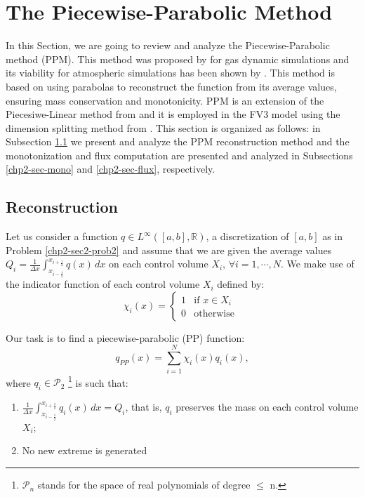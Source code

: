 \section{The Piecewise-Parabolic Method}
\label{chp2-sec-ppm}
In this Section, we are going to review and analyze the Piecewise-Parabolic method (PPM).
This method was proposed by \citet{colella:1984} for gas dynamic simulations and
its viability for atmospheric simulations has been shown by \citet{carpenter:1990}.
This method is based on using parabolas to reconstruct the function from its 
average values, ensuring mass conservation and monotonicity.
PPM is an extension of the Piecesiwe-Linear method from \citet{vanleer:1977}
and it is employed in the FV3 model using the dimension splitting method from \citet{lin:1996}.
This section is organized as follows: in Subsection \ref{chp2-sec-recon} 
we present and analyze the PPM reconstruction method and the monotonization and 
flux computation are presented and analyzed in Subsections 
\ref{chp2-sec-mono} and \ref{chp2-sec-flux}, respectively.


\subsection{Reconstruction}
\label{chp2-sec-recon}
Let us consider a function ${q} \in L^{\infty}([a, b],\mathbb{R})$, a discretization of
$[a,b]$ as in Problem \ref{chp2-sec2-prob2}
and assume that we are given the average values ${Q}_i = \frac{1}{\Delta x} 
\int_{x_{i-\frac{1}{2}}}^{x_{i+\frac{1}{2}}} {q}(x) \,dx$
on each control volume $X_i$, $\forall i = 1, \cdots, N $.
We make use of the indicator function of each control volume $X_i$ defined by:
\begin{equation*}
	\label{chp2-sec3-1-eq1}
	\chi_{i}(x)=
	\begin{cases}
		1 & \text{if } x \in X_i\\
		0 & \text{otherwise }
	\end{cases}
\end{equation*}

Our task is to find a piecewise-parabolic (PP) 
function:
\begin{equation}
	\label{chp2-sec3-1-eq2}
	q_{PP}(x) = \sum_{i=1}^{N} \chi_i(x) q_i(x),
\end{equation}
where ${q}_i \in \mathcal{P}_2$
\footnote{$\mathcal{P}_n$ stands for the space of real polynomials of degree $\leq$ n.} 
is such that:
\begin{enumerate}
	\item $\frac{1}{\Delta x}\int_{x_{i-\frac{1}{2}}}^{x_{i+\frac{1}{2}}} {q}_i(x) \,dx = {Q}_i$,
	that is, $q_i$ preserves the mass on each control volume $X_i$;
	\item No new extreme is generated%
\end{enumerate}

